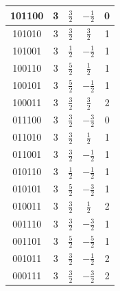\documentclass{article}
\begin{document}
\begin{tabular}{|c|c|c|c|c|}
       101100 & 3&$\frac{3}{2}$ &$-\frac{1}{2}$&0 \\\hline
       101010 & 3&$\frac{3}{2}$ &$\frac{3}{2}$&1 \\\hline
       101001 & 3& $\frac{1}{2}$&$-\frac{1}{2}$&1 \\\hline
       100110 & 3&$\frac{5}{2}$ &$\frac{1}{2}$&1 \\\hline
       100101 & 3& $\frac{5}{2}$&$-\frac{1}{2}$&1 \\\hline       
       100011 & 3&$\frac{3}{2}$ &$\frac{3}{2}$&2 \\\hline 
       011100 & 3& $\frac{3}{2}$&$-\frac{3}{2}$&0 \\\hline
       011010 & 3&$\frac{3}{2}$ &$\frac{1}{2}$&1 \\\hline
       011001 & 3&$\frac{3}{2}$ &$-\frac{1}{2}$&1 \\\hline
       010110 & 3&$\frac{1}{2}$ &$-\frac{1}{2}$&1 \\\hline
       010101 & 3&$\frac{5}{2}$ &$-\frac{3}{2}$&1 \\\hline
       010011 & 3& $\frac{3}{2}$&$\frac{1}{2}$&2 \\\hline
       001110 & 3&$\frac{3}{2}$ &$-\frac{3}{2}$&1 \\\hline
       001101 & 3&$\frac{5}{2}$ &$-\frac{5}{2}$&1 \\\hline
       001011 & 3& $\frac{3}{2}$&$-\frac{1}{2}$&2 \\\hline
       000111 & 3& $\frac{3}{2}$&$-\frac{3}{2}$&2 \\\hline
   \end{tabular}
\end{document}
